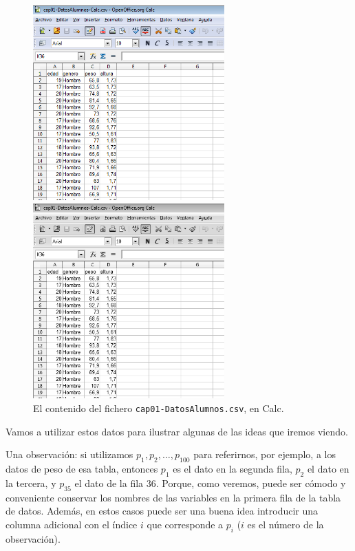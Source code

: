     \begin{figure}[h]
	\begin{center}
	\begin{enColor}
	\includegraphics[height=7.5cm]{../fig/Cap01-DatosAlumnos.png}
	\end{enColor}
	\begin{bn}
	\includegraphics[height=7.5cm]{../fig/Cap01-DatosAlumnos-bn.png}
	\end{bn}
	\caption{El contenido del fichero {\tt cap01-DatosAlumnos.csv}, en Calc.}
	\label{cap01:fig:DatosAlumnosCalc}
    \end{center}
    \end{figure}


Vamos a utilizar estos datos para ilustrar algunas de las ideas que iremos viendo.

Una observación: si utilizamos $p_1,p_2,\ldots,p_{100}$ para referirnos, por ejemplo, a los datos de peso de esa tabla,
entonces $p_1$ es el dato en la segunda fila, $p_2$ el dato en la tercera, y
$p_{35}$ el dato de la fila $36$. Porque, como veremos, puede ser
cómodo y conveniente conservar los nombres de las variables en la primera fila
de la tabla de datos. Además, en estos casos puede ser una buena idea
introducir una columna adicional con el índice $i$ que corresponde a $p_i$ ($i$
es el número de la observación).

